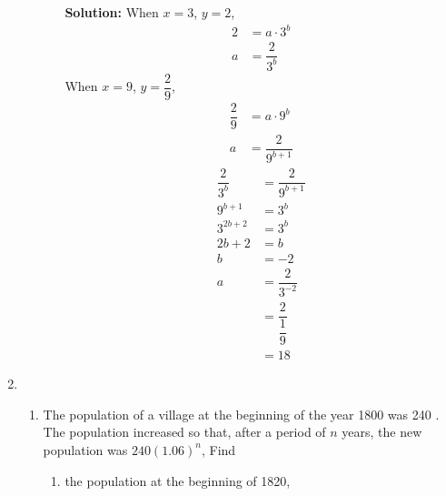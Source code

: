 \documentclass{report}
\newcommand{\sol}{\vspace{0.2cm}\textbf{Solution:}\vspace{0.2cm}}
\begin{document}
\begin{multicols*}{2}
\begin{enumerate}[leftmargin=*]
\begin{enumerate}
\begin{enumerate}
                                  \sol{}
                                  When $x = 3$, $y = 2$,
                                  \begin{align*}
                                      2 & = a \cdot 3^b    \\
                                      a & = \dfrac{2}{3^b}
                                  \end{align*}
                                  When $x = 9$, $y = \dfrac{2}{9}$,
                                  \begin{align*}
                                      \dfrac{2}{9} & = a \cdot 9^b        \\
                                      a            & = \dfrac{2}{9^{b+1}}
                                  \end{align*}
                                  \begin{align*}
                                      \dfrac{2}{3^b} & = \dfrac{2}{9^{b+1}}      \\
                                      9^{b+1}        & = 3^b                     \\
                                      3^{2b + 2}     & = 3^b                     \\
                                      2b + 2         & = b                       \\
                                      b              & = -2                      \\
                                      a              & = \dfrac{2}{3^{-2}}       \\
                                                     & = \dfrac{2}{\dfrac{1}{9}} \\
                                                     & = 18
                                  \end{align*}
                        \end{enumerate}
              \end{enumerate}

        \item \begin{enumerate}
                  \item The population of a village at the beginning of the year 1800 was 240 . The
                        population increased so that, after a period of $n$ years, the new population
                        was $240(1.06)^n$, Find
                        \begin{enumerate}[label=(\roman*)]
                            \item  the population at the beginning of 1820,


\end{enumerate}
\end{enumerate}
\end{enumerate}
\end{multicols*}
\end{document}
